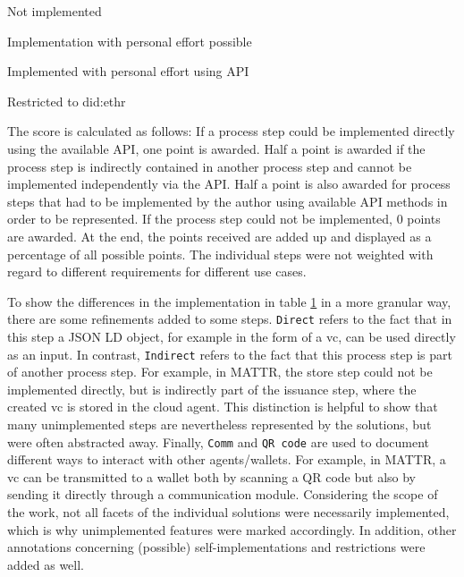 \begin{table}[htp!]
\begin{threeparttable}
\begin{tabular}{llllll}
            \hline
            \end{tabular}
            \begin{tablenotes}\footnotesize 
    		    \item[1] Not implemented
        		\item[2] Implementation with personal effort possible
        		\item[3] Implemented with personal effort using API
        		\item[4] Restricted to did:ethr
    		\end{tablenotes}
    		\label{table: impl results}
		\end{threeparttable}
    \end{table}
    
    The score is calculated as follows: If a process step could be implemented directly using the available API, one point is awarded. Half a point is awarded if the process step is indirectly contained in another process step and cannot be implemented independently via the API. Half a point is also awarded for process steps that had to be implemented by the author using available API methods in order to be represented. If the process step could not be implemented, 0 points are awarded. At the end, the points received are added up and displayed as a percentage of all possible points. The individual steps were not weighted with regard to different requirements for different use cases.
    
    To show the differences in the implementation in table \ref{table: impl results} in a more granular way, there are some refinements added to some steps. \texttt{Direct} refers to the fact that in this step a JSON LD object, for example in the form of a \ac{vc}, can be used directly as an input. In contrast, \texttt{Indirect} refers to the fact that this process step is part of another process step. For example, in MATTR, the store step could not be implemented directly, but is indirectly part of the issuance step, where the created \ac{vc} is stored in the cloud agent. This distinction is helpful to show that many unimplemented steps are nevertheless represented by the solutions, but were often abstracted away. Finally, \texttt{Comm} and \texttt{QR code} are used to document different ways to interact with other agents/wallets. For example, in MATTR, a \ac{vc} can be transmitted to a wallet both by scanning a QR code but also by sending it directly through a communication module. Considering the scope of the work, not all facets of the individual solutions were necessarily implemented, which is why unimplemented features were marked accordingly. In addition, other annotations concerning (possible) self-implementations and restrictions were added as well. 
    
